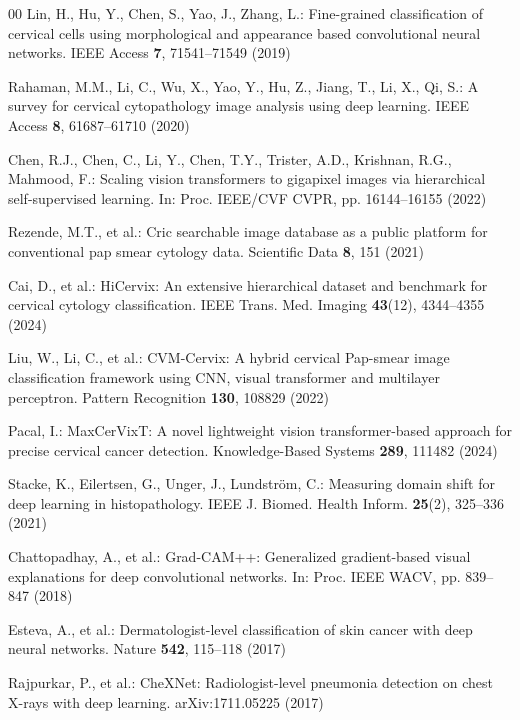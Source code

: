 \documentclass[runningheads]{llncs}
\begin{document}
\begin{thebibliography}{00}
Lin, H., Hu, Y., Chen, S., Yao, J., Zhang, L.: Fine-grained classification of cervical cells using morphological and appearance based convolutional neural networks. IEEE Access \textbf{7}, 71541--71549 (2019)

Rahaman, M.M., Li, C., Wu, X., Yao, Y., Hu, Z., Jiang, T., Li, X., Qi, S.: A survey for cervical cytopathology image analysis using deep learning. IEEE Access \textbf{8}, 61687--61710 (2020)

Chen, R.J., Chen, C., Li, Y., Chen, T.Y., Trister, A.D., Krishnan, R.G., Mahmood, F.: Scaling vision transformers to gigapixel images via hierarchical self-supervised learning. In: Proc. IEEE/CVF CVPR, pp. 16144--16155 (2022)

Rezende, M.T., et al.: Cric searchable image database as a public platform for conventional pap smear cytology data. Scientific Data \textbf{8}, 151 (2021)

Cai, D., et al.: HiCervix: An extensive hierarchical dataset and benchmark for cervical cytology classification. IEEE Trans. Med. Imaging \textbf{43}(12), 4344--4355 (2024)

Liu, W., Li, C., et al.: CVM-Cervix: A hybrid cervical Pap-smear image classification framework using CNN, visual transformer and multilayer perceptron. Pattern Recognition \textbf{130}, 108829 (2022)

Pacal, I.: MaxCerVixT: A novel lightweight vision transformer-based approach for precise cervical cancer detection. Knowledge-Based Systems \textbf{289}, 111482 (2024)

Stacke, K., Eilertsen, G., Unger, J., Lundstr\"om, C.: Measuring domain shift for deep learning in histopathology. IEEE J. Biomed. Health Inform. \textbf{25}(2), 325--336 (2021)

Chattopadhay, A., et al.: Grad-CAM++: Generalized gradient-based visual explanations for deep convolutional networks. In: Proc. IEEE WACV, pp. 839--847 (2018)

Esteva, A., et al.: Dermatologist-level classification of skin cancer with deep neural networks. Nature \textbf{542}, 115--118 (2017)

Rajpurkar, P., et al.: CheXNet: Radiologist-level pneumonia detection on chest X-rays with deep learning. arXiv:1711.05225 (2017)


\end{thebibliography}
\end{document}
